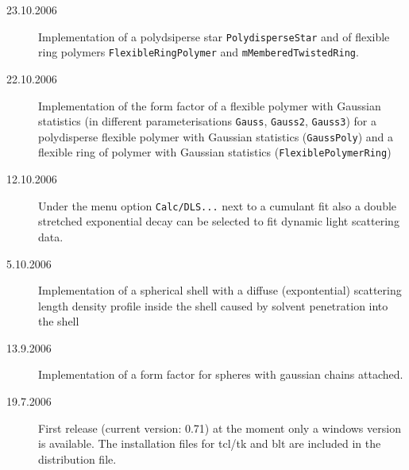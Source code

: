 \begin{description}
    \item[23.10.2006] Implementation of a polydsiperse star \texttt{PolydisperseStar} and
    of flexible ring polymers \texttt{FlexibleRingPolymer} and \texttt{mMemberedTwistedRing}.
    \item[22.10.2006] Implementation of the form factor of a flexible polymer with Gaussian statistics
    (in different parameterisations \verb"Gauss", \verb"Gauss2", \verb"Gauss3") for a polydisperse flexible
    polymer with Gaussian statistics (\verb"GaussPoly") and a flexible ring of polymer with Gaussian statistics
    (\verb"FlexiblePolymerRing")
    \item[12.10.2006] Under the menu option \verb"Calc/DLS..." next to a cumulant fit also
      a double stretched exponential decay can be selected to fit dynamic light scattering data.
    \item[5.10.2006] Implementation of a spherical shell with a diffuse
      (expontential) scattering length density profile inside the shell
      caused by solvent penetration into the shell
    \item[13.9.2006] Implementation of a form factor for spheres
      with gaussian chains attached.
    \item[19.7.2006] First release (current version: 0.71)
      at the moment only a windows version is available. The
      installation files for tcl/tk and blt are included in the
      distribution file.
\end{description}
